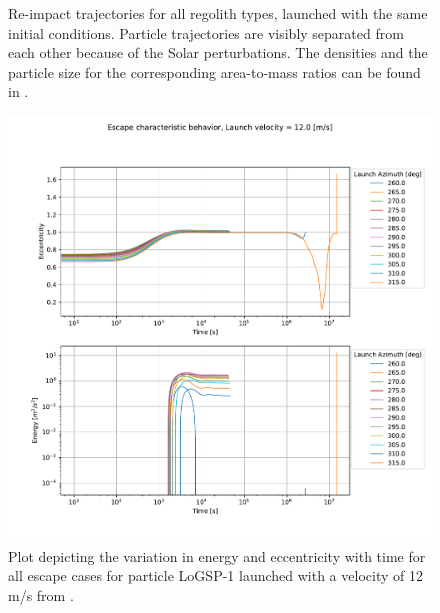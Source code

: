 \documentclass[print]{tudelft-report}
\begin{document}
\begin{appendices}
\begin{figure}[htb]
    \caption{Re-impact trajectories for all regolith types, launched with the same initial conditions. Particle trajectories are visibly separated from each other because of the Solar perturbations. The densities and the particle size for the corresponding area-to-mass ratios can be found in .}
    \label{fig:crash_traj_14ms_115Azim_315solarPhase_leadingEdge}
    \end{figure}
    \FloatBarrier
    \begin{figure}[htb]
    \centering
    \captionsetup{justification=centering}
    \includegraphics[width=\textwidth, height=0.6\textheight, keepaspectratio=true]{Results/Images/leading_edge_perturbations/logsp1_escape_energy_ecc_12ms_solarPhase225.pdf}
    \caption{Plot depicting the variation in energy and eccentricity with time for all escape cases for particle LoGSP-1 launched with a velocity of 12 m/s from \protect{}.}
    \label{fig:leadingEdge_logsp1_escape_energy_ecc_12ms_solar225}
    \end{figure}
    \FloatBarrier
    \begin{figure}[htb]
    \centering
    \captionsetup{justification=centering}

\end{figure}
\end{appendices}
\end{document}
